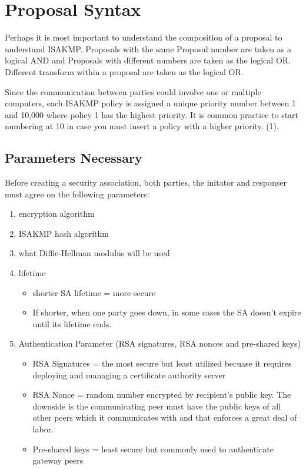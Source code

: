 \documentclass{report}
\newcommand{\squash}{\itemsep=0pt\parskip=0pt}
\begin{document}
\chapter {Proposal Syntax}

Perhaps it is most important to understand the composition of a proposal to understand ISAKMP. Proposals with the same Proposal number are taken as a logical AND and Proposals with different numbers are taken as the logical OR. Different transform within a proposal are taken as the logical OR.

Since the communication between parties could involve one or multiple computers, each ISAKMP policy is assigned a unique priority number between 1 and 10,000 where policy 1 has the highest priority. It is common practice to start numbering at 10 in case you must insert a policy with a higher priority. (1).

\section {Parameters Necessary}

Before creating a security association, both parties, the initator and responser must agree on the following parameters:

\begin{enumerate}
  \squash
\item encryption algorithm
\item ISAKMP hash algorithm
\item what Diffie-Hellman modulus will be used
\item lifetime
  \begin{itemize}
  \item shorter SA lifetime = more secure
  \item If shorter, when one party goes down, in some cases the SA doesn't expire until its lifetime ends.
  \end{itemize}
\item Authentication Parameter (RSA signatures, RSA nonces and pre-shared keys)
  \begin{itemize}
  \item RSA Signatures = the most secure but least utilized becuase it requires deploying and managing a certificate authority server
  \item RSA Nonce = random number encrypted by recipient's public key. The downside is the communicating peer must have the public keys of all other peers which it communicates with and that enforces a great deal of labor.
    \item Pre-shared keys = least secure but commonly used to authenticate gateway peers
  \end{itemize}
\end{enumerate}
\end{document}
